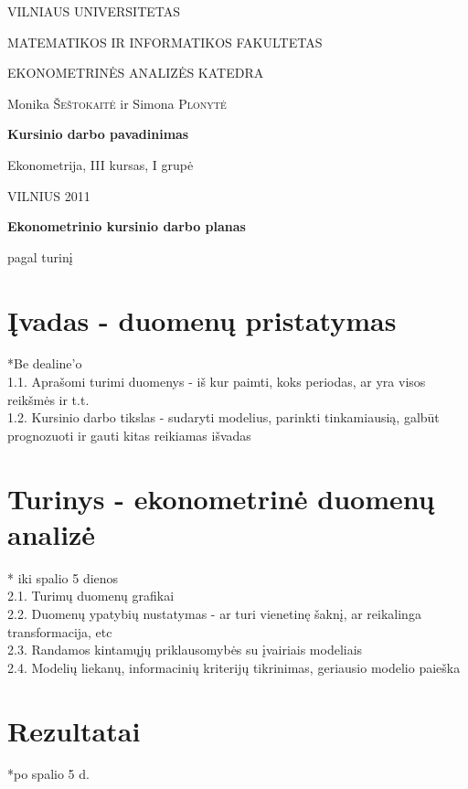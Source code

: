 \documentclass[a4paper]{article}
\begin{document}
\begin{titlepage}
\centerline{ \large VILNIAUS UNIVERSITETAS}
\bigskip
\centerline{\large MATEMATIKOS IR INFORMATIKOS FAKULTETAS}
\smallskip

\centerline{\large  EKONOMETRINĖS ANALIZĖS KATEDRA}
\vskip 200pt
\centerline{ \large Monika \textsc{Šeštokaitė} ir \large Simona \textsc{Plonytė}}
\vskip 50pt
\centerline{\bf \Large Kursinio darbo pavadinimas}
\bigskip
\vskip 50pt
\hfill Ekonometrija, III kursas, I grupė
\vskip 100pt
\centerline{\large VILNIUS 2011}
\end{titlepage}

\pagebreak

\centerline{\bf \Large Ekonometrinio kursinio darbo planas}
\centerline{pagal turinį}
\section{ Įvadas - duomenų pristatymas}

*Be dealine'o \\

	1.1. Aprašomi turimi duomenys - iš kur paimti, koks periodas, ar yra visos reikšmės ir t.t. \\

	1.2. Kursinio darbo tikslas - sudaryti modelius, parinkti tinkamiausią, galbūt prognozuoti ir gauti kitas reikiamas išvadas

\section{ Turinys - ekonometrinė duomenų analizė} 
* iki spalio 5 dienos \\

	2.1. Turimų duomenų grafikai\\

	2.2. Duomenų ypatybių nustatymas - ar turi vienetinę šaknį, ar reikalinga transformacija, etc\\

	2.3. Randamos kintamųjų priklausomybės su įvairiais modeliais\\

	2.4. Modelių liekanų, informacinių kriterijų tikrinimas, geriausio modelio paieška\\

\section{Rezultatai}
*po spalio 5 d.\\
\end{document}
